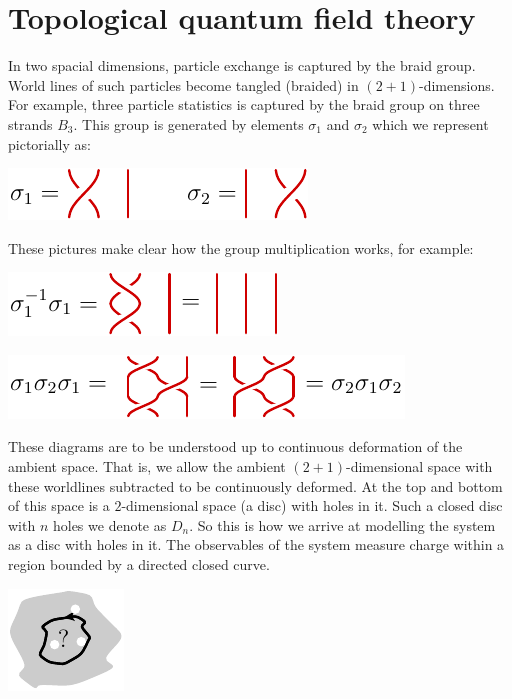 \documentclass[aps, prl, letterpaper, twocolumn, superscriptaddress, notitlepage, 10pt]{revtex4-1}
\begin{document}
%
%

\section{Topological quantum field theory}

In two spacial dimensions, particle exchange is
captured by the braid group.
World lines of such particles 
become tangled (braided) in $(2+1)$-dimensions.
For example, three particle statistics is captured
by the braid group on three strands $B_3.$
This group is generated by elements $\sigma_1$
and $\sigma_2$ which we represent pictorially as:
\begin{center}
\includegraphics[]{pic-braid-group.pdf}
\end{center}

These pictures make clear how the group
multiplication works, for example:
\begin{center}
\includegraphics[]{pic-braid-group-1.pdf}
\end{center}
\begin{center}
\includegraphics[]{pic-braid-relation.pdf}
\end{center}


These diagrams are to be understood up to
continuous deformation of the ambient space.
That is, we allow the ambient $(2+1)$-dimensional
space with these worldlines subtracted to be continuously
deformed.
At the top and bottom of this space is 
a $2$-dimensional space (a disc) with holes in it.
Such a closed disc with $n$ holes we denote as $D_n.$
So this is how we arrive at modelling the system as
a disc with holes in it.
The observables of the system measure charge within
a region bounded by a directed closed curve.
\begin{center}
\includegraphics[]{pic-observable.pdf}
\end{center}
\end{document}
